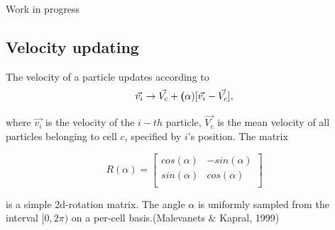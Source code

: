 \documentclass[
]{article}
\begin{document}
Work in progress

\hypertarget{velocity-updating}{%
\subsection{Velocity updating}\label{velocity-updating}}

The velocity of a particle updates according to \begin{equation}
\vec{v_{i}} \rightarrow \vec{V_c} + \textbf(\alpha)[\vec{v_i} - \vec{V_c}],
\end{equation}

where \(\vec{v_{i}}\) is the velocity of the \(i-th\) particle,
\(\vec{V_c}\) is the mean velocity of all particles belonging to cell
\(c\), specified by \(i\)'s position. The matrix

\[
R(\alpha) = 
\left[ \begin{array}{rr}
cos(\alpha) & -sin(\alpha) \\
sin(\alpha) & cos(\alpha) \\
\end{array}\right]
\]

is a simple 2d-rotation matrix. The angle \(\alpha\) is uniformly
sampled from the interval \([0, 2\pi)\) on a per-cell basis.(Malevanets
\& Kapral, 1999)
\end{document}
